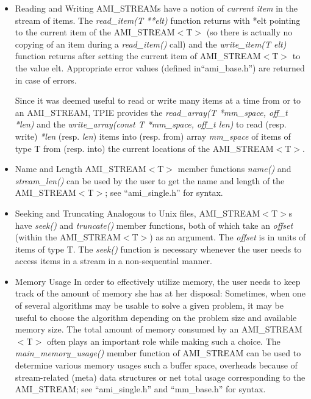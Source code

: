 \begin{itemize}
\item{Reading and Writing} AMI\_STREAMs have a notion of \emph{current
item} in the stream of items. The \emph{read\_item(T **elt)} function
returns with *elt pointing to the current item of the AMI\_STREAM$<$T$>$
(so there is actually no copying of an item during a
\emph{read\_item()} call) and the  \emph{write\_item(T elt)} function 
returns after setting the current item of AMI\_STREAM$<$T$>$ to the value 
elt. Appropriate error values (defined in``ami\_base.h'') are returned 
in case of errors.

Since it was deemed useful to read or write many items at a time
from or to an AMI\_STREAM, TPIE provides the \emph{read\_array(T
*mm\_space, off\_t *len)} and the 
\emph{write\_array(const T *mm\_space, off\_t len)} to read
(resp. write) \emph{*len} (resp. \emph{len}) items into (resp. from) 
array \emph{mm\_space} of items of type T from (resp. into) the
current locations of the AMI\_STREAM$<$T$>$.

\item{Name and Length}
AMI\_STREAM$<$T$>$ member functions \emph{name()} and \emph{stream\_len()}
can be used by the user to get the name and length of the
AMI\_STREAM$<$T$>$; see ``ami\_single.h'' for syntax.

\item{Seeking and Truncating}
Analogous to Unix files, AMI\_STREAM$<$T$>$s have \emph{seek()} and
\emph{truncate()} member functions, both of which take an 
\emph{offset} (within the AMI\_STREAM$<$T$>$) as an argument. The 
\emph{offset} is in units of items of type T. The \emph{seek()}
function is necessary whenever the user needs to access items
in a stream in a non-sequential manner.


\item{Memory Usage}
In order to effectively utilize memory, the user needs to keep track
of the amount of memory she has at her disposal: Sometimes, 
when one of several algorithms may be usable to solve a given problem,
it may be useful to choose the algorithm depending on the problem
size and available memory size. The total amount of memory consumed
by an AMI\_STREAM$<$T$>$ often plays an important role while making such 
a choice. The  \emph{main\_memory\_usage()} member function of
AMI\_STREAM can be used to determine various memory usages
such a buffer space, overheads because of stream-related (meta)
data structures or net total usage corresponding to the AMI\_STREAM;
see ``ami\_single.h'' and ``mm\_base.h'' for syntax.


\end{itemize}
